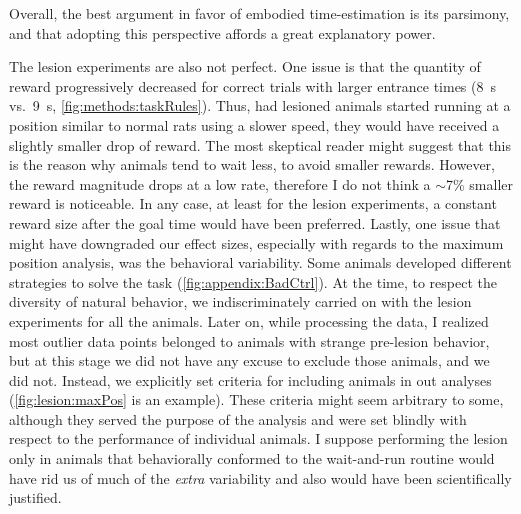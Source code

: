 Overall, the best argument in favor of embodied time-estimation is its parsimony, and that adopting this perspective affords a great explanatory power.
\par
The lesion experiments are also not perfect.
One issue is that the quantity of reward progressively decreased for correct trials with larger entrance times (8~s vs.\ 9~s, \autoref{fig:methods:taskRules}).
Thus, had lesioned animals started running at a position similar to normal rats using a slower speed, they would have received a slightly smaller drop of reward.
The most skeptical reader might suggest that this is the reason why animals tend to wait less, to avoid smaller rewards.
However, the reward magnitude drops at a low rate, therefore I do not think a $\sim$7\% smaller reward is noticeable.
In any case, at least for the lesion experiments, a constant reward size after the goal time would have been preferred.
Lastly, one issue that might have downgraded our effect sizes, especially with regards to the maximum position analysis, was the behavioral variability.
Some animals developed different strategies to solve the task (\autoref{fig:appendix:BadCtrl}).
At the time, to respect the diversity of natural behavior, we indiscriminately carried on with the lesion experiments for all the animals.
Later on, while processing the data, I realized most outlier data points belonged to animals with strange pre-lesion behavior, but at this stage we did not have any excuse to exclude those animals, and we did not.
Instead, we explicitly set criteria for including animals in out analyses (\autoref{fig:lesion:maxPos} is an example).
These criteria might seem arbitrary to some, although they served the purpose of the analysis and were set blindly with respect to the performance of individual animals.
I suppose performing the lesion only in animals that behaviorally conformed to the wait-and-run routine would have rid us of much of the \textit{extra} variability and also would have been scientifically justified.


